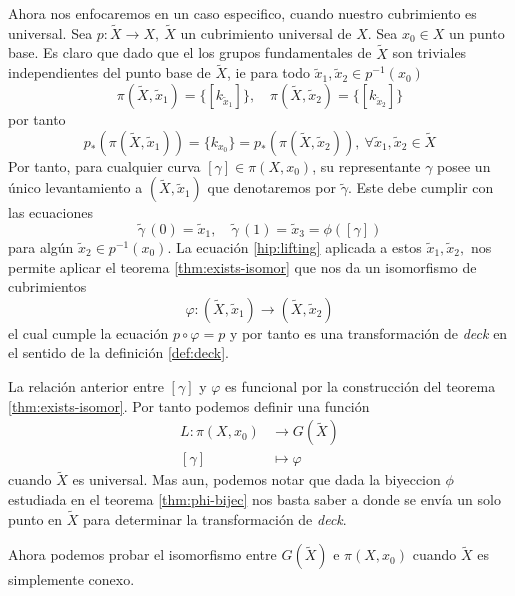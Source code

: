 Ahora nos enfocaremos en un caso especifico, cuando nuestro cubrimiento
es universal. Sea \(p : \tilde X \to X,\ \tilde X\) un
cubrimiento universal de \(X\). Sea \(x_0 \in X\) un punto base. Es
claro que dado que el los grupos fundamentales de \(\tilde X\) son
triviales independientes del punto base de \(\tilde X\), ie para todo
\(\tilde x_1, \tilde x_2 \in p^{-1} (x_0)\)
\begin{equation*}
  \pi \left( \tilde X , \tilde x_1 \right) = \{[k_{\tilde x_1}]\},\quad
  \pi \left( \tilde X , \tilde x_2 \right) = \{ [k_{\tilde x_2}]\}
\end{equation*}
por tanto
\begin{equation} \label{hip:lifting}
  p_* \left( \pi \left( \tilde X , \tilde x_1 \right) \right) =
  \{k_{x_0}\} = p_* \left( \pi \left( \tilde X , \tilde x_2 \right)
  \right),\ \forall \tilde x_1 , \tilde x_2 \in \tilde X
\end{equation}
Por tanto, para cualquier curva \([\gamma] \in \pi (X , x_0)\), su
representante \(\gamma\) posee un único levantamiento a \((\tilde X,
\tilde x_1)\) que denotaremos por \(\tilde \gamma\). Este debe cumplir
con las ecuaciones
\[ \tilde \gamma \, (0) = \tilde x_1, \quad \tilde \gamma \, (1) =
  \tilde x_3 = \phi ([\gamma]) \]
para algún \(\tilde x_2 \in p^{-1} (x_0)\). La ecuación
\eqref{hip:lifting} aplicada a estos \(\tilde x_1, \tilde x_2,\) nos
permite aplicar el teorema \ref{thm:exists-isomor} que nos da un
isomorfismo de cubrimientos
\[\varphi : (\tilde X , \tilde x_1) \to (\tilde X , \tilde x_2 ) \]
el cual cumple la ecuación \(p \circ \varphi = p\) y por tanto es una
transformación de \emph{deck} en el sentido de la definición
\ref{def:deck}.

La relación anterior entre \([\gamma]\) y \(\varphi\) es funcional por
la construcción del teorema \ref{thm:exists-isomor}. Por tanto podemos
definir una función
\begin{align}
  L : \pi (X, x_0) &\longrightarrow G (\tilde X) \label{def:L} \\
  [\gamma] &\longmapsto \varphi \nonumber
\end{align}
cuando \(\tilde X\) es universal. Mas aun, podemos notar que dada la
biyeccion \(\phi\) estudiada en el teorema \ref{thm:phi-bijec} nos basta
saber a donde se envía un solo punto en \(\tilde X\) para determinar la
transformación de \emph{deck}.

Ahora podemos probar el isomorfismo entre \(G (\tilde X)\) e \(\pi (X,
x_0)\) cuando \(\tilde X\) es simplemente conexo.

